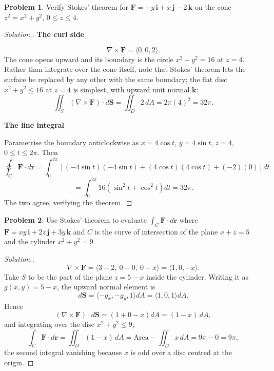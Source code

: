 \documentclass[11pt,a4paper]{article}
\theoremstyle{definition}
\newtheorem{problemx}{Problem}[subsection]
\newenvironment{problem}{\begin{problemx}}{\end{problemx}}
\newenvironment{solution}
  {\renewcommand{\qedsymbol}{}\begin{proof}[\textit{Solution}.]}
  {\end{proof}}
\newcommand{\subhead}[1]{%
  \par\medskip\noindent\textbf{#1}\par\nobreak\smallskip}
\begin{document}
\begin{problem}
Verify Stokes' theorem for
$\mathbf{F} = -y\,\mathbf{i} + x\,\mathbf{j} - 2\,\mathbf{k}$ on the cone
$z^2 = x^2+y^2$, $0\leq z\leq 4$.
\end{problem}
\begin{solution}
\subhead{The curl side}
\[\nabla\times\mathbf{F} = \langle 0,0,2\rangle .\]
The cone opens upward and its boundary is the circle $x^2+y^2 = 16$ at $z=4$.
Rather than integrate over the cone itself, note that Stokes' theorem lets the
surface be replaced by any other with the same boundary; the flat disc
$x^2+y^2\leq 16$ at $z=4$ is simplest, with upward unit normal
$\mathbf{k}$:
\[\iint_S(\nabla\times\mathbf{F})\cdot d\textbf{S}
= \iint_D 2\,dA = 2\pi(4)^2 = 32\pi .\]

\subhead{The line integral}
Parametrise the boundary anticlockwise as
$x = 4\cos t$, $y = 4\sin t$, $z = 4$, $0\leq t\leq 2\pi$. Then
\[\oint_C\mathbf{F}\cdot d\mathbf r
= \int_0^{2\pi}[(-4\sin t)(-4\sin t) + (4\cos t)(4\cos t)
+ (-2)(0)]dt\]
\[= \int_0^{2\pi}16(\sin^2t+\cos^2t)dt = 32\pi .\]
The two agree, verifying the theorem.
\end{solution}

\begin{problem}
Use Stokes' theorem to evaluate
$\displaystyle{\int_C\mathbf{F}\cdot d\mathbf r}$ where
$\mathbf{F} = xy\,\mathbf{i} + 2z\,\mathbf{j} + 3y\,\mathbf{k}$ and $C$ is the
curve of intersection of the plane $x+z = 5$ and the cylinder
$x^2+y^2 = 9$.
\end{problem}
\begin{solution}
\[\nabla\times\mathbf{F}
= \langle 3-2,\ 0-0,\ 0-x\rangle = \langle 1, 0, -x\rangle .\]
Take $S$ to be the part of the plane $z = 5-x$ inside the cylinder. Writing it
as $g(x,y) = 5-x$, the upward normal element is
\[d\textbf{S} = \langle -g_x, -g_y, 1\rangle dA = \langle 1, 0, 1\rangle dA .\]
Hence
\[(\nabla\times\mathbf{F})\cdot d\textbf{S}
= (1 + 0 - x)dA = (1-x)\,dA ,\]
and integrating over the disc $x^2+y^2\leq 9$,
\[\int_C\mathbf{F}\cdot d\mathbf r = \iint_D(1-x)\,dA
= \text{Area} - \iint_D x\,dA = 9\pi - 0 = 9\pi ,\]
the second integral vanishing because $x$ is odd over a disc centred at the
origin.
\end{solution}
\end{document}
